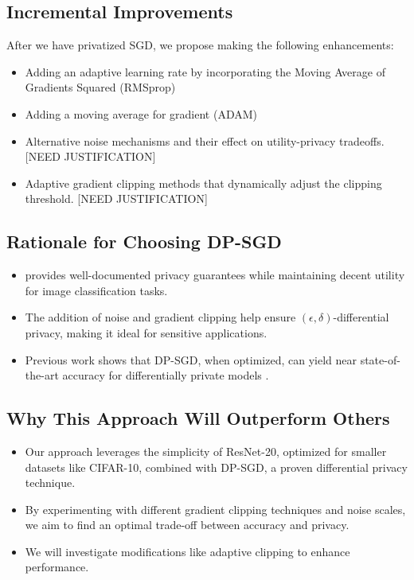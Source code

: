 \documentclass{article}
\begin{document}
    \subsection{Incremental Improvements}\label{subsec:incremental-improvements}
    After we have privatized SGD, we propose making the following enhancements:
    \begin{itemize}
        \item Adding an adaptive learning rate by incorporating the Moving Average of Gradients Squared (RMSprop) \cite{DBLP:journals/corr/abs-1807-06766}
        \item Adding a moving average for gradient (ADAM) \cite{DBLP:journals/corr/abs-1807-06766}
        \item Alternative noise mechanisms and their effect on utility-privacy tradeoffs. [NEED JUSTIFICATION]
        \item Adaptive gradient clipping methods that dynamically adjust the clipping threshold. [NEED JUSTIFICATION]
    \end{itemize}

    \subsection{Rationale for Choosing DP-SGD}\label{subsec:rationale-for-choosing-dp-sgd}
    \begin{itemize}
        \item provides well-documented privacy guarantees \cite{Abadi_2016_DeepLearningDifferentialPrivacy}
        while maintaining decent utility for image classification tasks.
        \item The addition of noise and gradient clipping help ensure $(\epsilon, \delta)$-differential privacy,
        making it ideal for sensitive applications.
        \item Previous work shows that DP-SGD, when optimized, can yield near state-of-the-art accuracy
        for differentially private models \cite{De_2022_ScaleDP_ImageClassification}.
    \end{itemize}

    \subsection{Why This Approach Will Outperform Others}\label{subsec:why-this-approach-will-outperform-others}
    \begin{itemize}
        \item Our approach leverages the simplicity of ResNet-20, optimized for smaller datasets like CIFAR-10,
        combined with DP-SGD, a proven differential privacy technique.
        \item By experimenting with different gradient clipping techniques and noise scales,
        we aim to find an optimal trade-off between accuracy and privacy.
        \item We will investigate modifications like adaptive clipping to enhance performance.
    \end{itemize}
\end{document}
